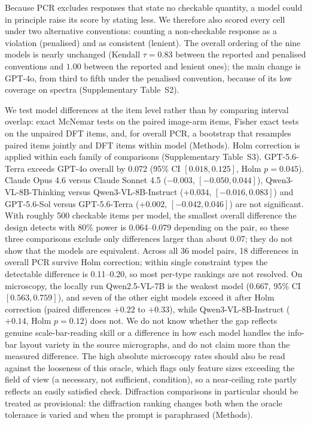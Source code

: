 \documentclass[pdflatex,sn-nature]{sn-jnl}
\newcommand{\rev}[1]{#1}
\newcommand{\rev}[1]{{\color{blue}#1}}
\begin{document}
\rev{Because PCR excludes responses that state no checkable quantity, a model could in
principle raise its score by stating less. We therefore also scored every cell under two
alternative conventions: counting a non-checkable response as a violation (penalised) and as
consistent (lenient). The overall ordering of the nine models is nearly unchanged (Kendall
$\tau=0.83$ between the reported and penalised conventions and $1.00$ between the reported and
lenient ones); the main change is GPT-4o, from third to fifth under the penalised
convention, because of its low coverage on spectra (Supplementary Table~S2).}

\rev{We test model differences at the item level rather than by comparing interval overlap:
exact McNemar tests on the paired image-arm items, Fisher exact tests on the unpaired DFT items,
and, for overall PCR, a bootstrap that resamples paired items jointly and DFT items within
model (Methods). Holm correction is applied within each family of comparisons (Supplementary
Table~S3). GPT-5.6-Terra exceeds GPT-4o overall by 0.072 (95\% CI $[0.018,0.125]$, Holm
$p=0.045$). Claude Opus 4.6 versus Claude Sonnet 4.5 ($-0.003$, $[-0.050,0.044]$),
Qwen3-VL-8B-Thinking versus Qwen3-VL-8B-Instruct ($+0.034$, $[-0.016,0.083]$) and
GPT-5.6-Sol versus GPT-5.6-Terra ($+0.002$, $[-0.042,0.046]$) are not significant. With
roughly 500 checkable items per model, the smallest overall difference the design detects with
80\% power is 0.064--0.079 depending on the pair, so these three comparisons exclude only
differences larger than about 0.07; they do not show that the models are equivalent. Across all
36 model pairs, 18 differences in overall PCR survive Holm correction; within single
constraint types the detectable difference is 0.11--0.20, so most per-type rankings are not
resolved. On microscopy, the locally run Qwen2.5-VL-7B is the weakest model (0.667, 95\% CI
$[0.563,0.759]$), and seven of the other eight models exceed it after Holm correction (paired
differences $+0.22$ to $+0.33$), while Qwen3-VL-8B-Instruct ($+0.14$, Holm $p=0.12$) does not.} We do not
know whether the gap reflects genuine scale-bar-reading skill or a difference in how each model handles the
info-bar layout variety in the source micrographs, and do not claim more than the
measured difference. The high absolute microscopy rates should also be read against the
looseness of this oracle, which flags only feature sizes exceeding the field of view (a
necessary, not sufficient, condition), so a near-ceiling rate partly reflects an easily
satisfied check. \rev{Diffraction comparisons in particular should be treated as provisional:
the diffraction ranking changes both when the oracle tolerance is varied and when the prompt is
paraphrased (Methods).}
\end{document}
